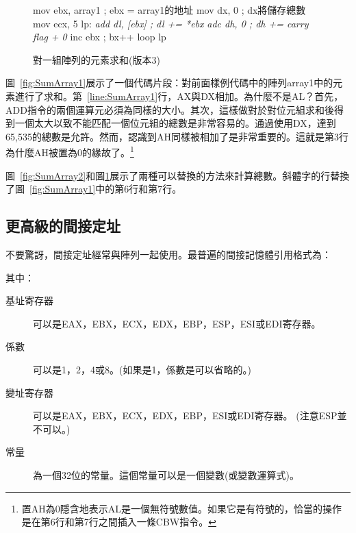 \begin{figure}[t]
\begin{AsmCodeListing}[frame=single,commandchars=\\\{\}]
      mov    ebx, array1           ; ebx = array1的地址
      mov    dx, 0                 ; dx將儲存總數
      mov    ecx, 5
lp:
\textit{      add    dl, [ebx]             ; dl += *ebx}
\textit{      adc    dh, 0                 ; dh += carry flag + 0}
      inc    ebx                   ; bx++
      loop   lp
\end{AsmCodeListing}
\caption{對一組陣列的元素求和(版本3)\label{fig:SumArray3}}
\end{figure}

圖~\ref{fig:SumArray1}展示了一個代碼片段：對前面樣例代碼中的陣列{\code array1}中的元素進行了求和。第~\ref{line:SumArray1}行，AX與DX相加。為什麼不是AL？首先，{\code ADD}指令的兩個運算元必須為同樣的大小。其次，這樣做對於對位元組求和後得到一個太大以致不能匹配一個位元組的總數是非常容易的。通過使用DX，達到65,535的總數是允許。然而，認識到AH同樣被相加了是非常重要的。這就是第3行為什麼AH被置為0的緣故了。\footnote{置AH為0隱含地表示AL是一個無符號數值。如果它是有符號的，恰當的操作是在第6行和第7行之間插入一條{\code CBW}指令。}

圖~\ref{fig:SumArray2}和圖\ref{fig:SumArray3}展示了兩種可以替換的方法來計算總數。斜體字的行替換了圖~\ref{fig:SumArray1}中的第6行和第7行。

\subsection{更高級的間接定址}

不要驚訝，間接定址經常與陣列一起使用。最普遍的間接記憶體引用格式為：
\begin{center}
{}
\end{center}
其中：
\begin{description}
\item[基址寄存器]可以是EAX，EBX，ECX，EDX，EBP，ESP，ESI或EDI寄存器。
\item[係數]可以是1，2，4或8。(如果是1，係數是可以省略的。)
\item[變址寄存器]可以是EAX，EBX，ECX，EDX，EBP，ESI或EDI寄存器。
                 (注意ESP並不可以。)
\item[常量]為一個32位的常量。這個常量可以是一個變數(或變數運算式)。
\end{description}

